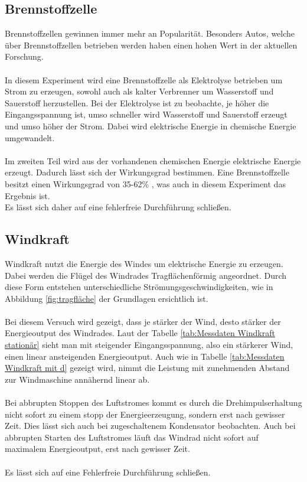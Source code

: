 \documentclass[12pt,a4paper,twoside]{article}
\begin{document}
\subsection{Brennstoffzelle}
Brennstoffzellen gewinnen immer mehr an Popularität. Besonders Autos, welche über Brennstoffzellen betrieben werden haben einen hohen Wert in der aktuellen Forschung. 
\\
\\
In diesem Experiment wird eine Brennstoffzelle als Elektrolyse betrieben um Strom zu erzeugen, sowohl auch als kalter Verbrenner um Wasserstoff und Sauerstoff herzustellen. 
Bei der Elektrolyse ist zu beobachte, je höher die Eingangsspannung ist, umso schneller wird Wasserstoff und Sauerstoff erzeugt und umso höher der Strom. 
Dabei wird elektrische Energie in chemische Energie umgewandelt. 
\\
\\
Im zweiten Teil wird aus der vorhandenen chemischen Energie elektrische Energie erzeugt. 
Dadurch lässt sich der Wirkungsgrad bestimmen. Eine Brennstoffzelle besitzt einen Wirkungsgrad von 35-62\% \cite{wiki3}, was auch in diesem Experiment das Ergebnis ist. 
\\
Es lässt sich daher auf eine fehlerfreie Durchführung schließen. 

\subsection{Windkraft}
Windkraft nutzt die Energie des Windes um elektrische Energie zu erzeugen. Dabei werden die Flügel des Windrades Tragflächenförmig angeordnet. 
Durch diese Form entstehen unterschiedliche Strömungsgeschwindigkeiten, wie in Abbildung \ref{fig:tragfläche} der Grundlagen ersichtlich ist. 
\\
\\
Bei diesem Versuch wird gezeigt, dass je stärker der Wind, desto stärker der Energieoutput des Windrades. Laut der Tabelle \ref{tab:Messdaten Windkraft stationär} sieht man mit steigender Eingangsspannung, also ein stärkerer Wind, einen linear ansteigenden Energieoutput. 
Auch wie in Tabelle \ref{tab:Messdaten Windkraft mit d} gezeigt wird, nimmt die Leistung mit zunehmenden Abstand zur Windmaschine annähernd linear ab. 
\\
\\
Bei abbrupten Stoppen des Luftstromes kommt es durch die Drehimpulserhaltung nicht sofort zu einem stopp der Energieerzeugung, sondern erst nach gewisser Zeit. Dies lässt sich auch bei zugeschaltenem Kondensator beobachten. 
Auch bei abbrupten Starten des Luftstromes läuft das Windrad nicht sofort auf maximalem Energieoutput, erst nach gewisser Zeit. 
\\
\\
Es lässt sich auf eine Fehlerfreie Durchführung schließen. 
\end{document}
